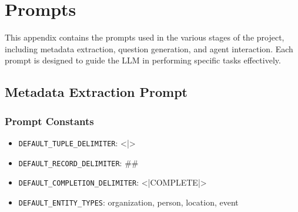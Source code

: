 \chapter{Prompts}
\label{chapter:appendixB}

This appendix contains the prompts used in the various stages of the project, including metadata extraction, question generation, and agent interaction. Each prompt is designed to guide the \gls{LLM} in performing specific tasks effectively.

\section{Metadata Extraction Prompt}\label{sec:metadata-extraction-prompt}\label{prompt:metadata-extraction}
\subsection{Prompt Constants}
\begin{itemize}
    \item \texttt{DEFAULT\_TUPLE\_DELIMITER}: <|>
    \item \texttt{DEFAULT\_RECORD\_DELIMITER}: \#\#
    \item \texttt{DEFAULT\_COMPLETION\_DELIMITER}: <|COMPLETE|>
    \item \texttt{DEFAULT\_ENTITY\_TYPES}: organization, person, location, event
\end{itemize}

